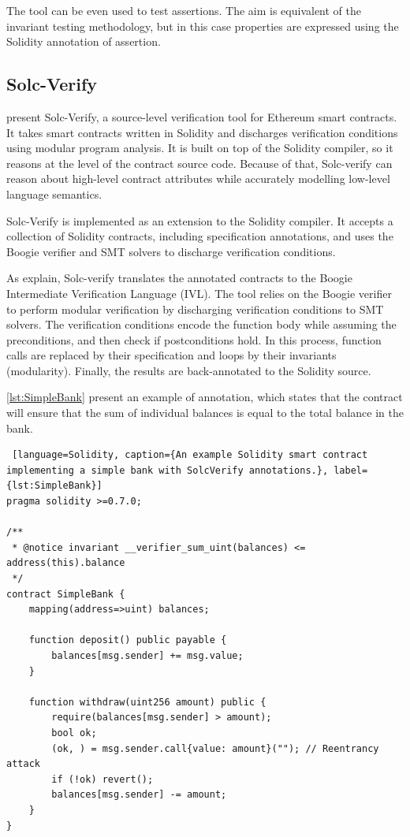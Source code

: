 The tool can be even used to test assertions. 
The aim is equivalent of the invariant testing methodology, 
but in this case properties are expressed using the Solidity annotation of assertion. 

\subsection{Solc-Verify}
\label{sec:Specification:Solc-Verify}

\citet{SolcVerify} present Solc-Verify, a source-level verification tool for
Ethereum smart contracts. It takes smart contracts written
in Solidity and discharges verification conditions using modular program
analysis. It is built on top of the Solidity compiler, so it reasons at the level of the contract source code. 
Because of that, Solc-verify can reason about high-level contract attributes 
while accurately modelling low-level language semantics.

Solc-Verify is implemented as an extension to the Solidity compiler.
It accepts a collection of Solidity contracts, including specification annotations, and uses 
the Boogie verifier and SMT solvers to discharge verification conditions. 

As \citet{SolcVerify_2} explain, Solc-verify translates the annotated contracts to the Boogie Intermediate Verification
Language (IVL). The tool relies on the Boogie verifier to perform modular
verification by discharging verification conditions to SMT solvers. The verification conditions
encode the function body while assuming the preconditions, and then check if postconditions
hold. In this process, function calls are replaced by their specification and loops by their
invariants (modularity). Finally, the results are back-annotated to the Solidity source.

\autoref{lst:SimpleBank} present an example of annotation, which states that the contract will ensure
that the sum of individual balances is equal to the total balance in the bank.


\begin{lstlisting} [language=Solidity, caption={An example Solidity smart contract implementing a simple bank with SolcVerify annotations.}, label={lst:SimpleBank}]
pragma solidity >=0.7.0;

/**
 * @notice invariant __verifier_sum_uint(balances) <= address(this).balance
 */
contract SimpleBank {
    mapping(address=>uint) balances;

    function deposit() public payable {
        balances[msg.sender] += msg.value;
    }

    function withdraw(uint256 amount) public {
        require(balances[msg.sender] > amount);
        bool ok;
        (ok, ) = msg.sender.call{value: amount}(""); // Reentrancy attack
        if (!ok) revert();
        balances[msg.sender] -= amount;
    }
}
\end{lstlisting}

